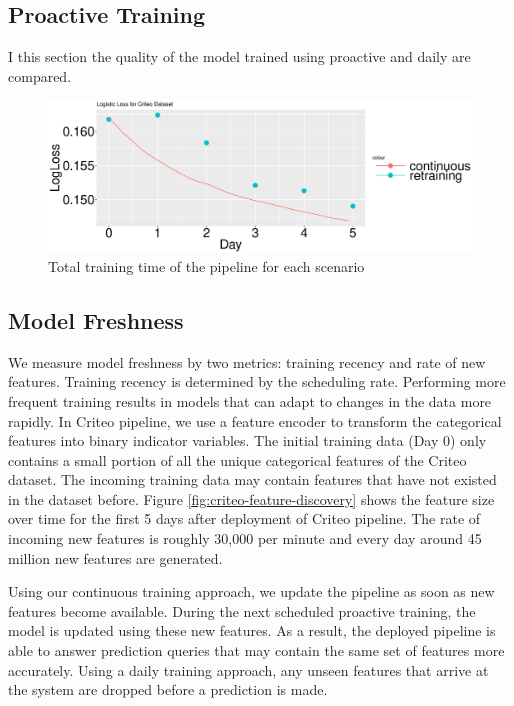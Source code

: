 \subsection{Proactive Training}
I this section the quality of the model trained using proactive and daily are compared.
\begin{figure}[h!]
\centering
\includegraphics[width=\columnwidth]{../images/experiment-results/criteo-log-loss-continuous-vs-daily.eps}
\caption{Total training time of the pipeline for each scenario}
\label{fig:loss-proactive-vs-daily}
\vspace{2mm}
\end{figure}


\subsection{Model Freshness}
We measure model freshness by two metrics: training recency and rate of new features.
Training recency is determined by the scheduling rate.
Performing more frequent training results in models that can adapt to changes in the data more rapidly.
In Criteo pipeline, we use a feature encoder to transform the categorical features into binary indicator variables.
The initial training data (Day 0) only contains a small portion of all the unique categorical features of the Criteo dataset.
The incoming training data may contain features that have not existed in the dataset before.
Figure \ref{fig:criteo-feature-discovery} shows the feature size over time for the first 5 days after deployment of Criteo pipeline.
The rate of incoming new features is roughly 30,000 per minute and every day around 45 million new features are generated.

Using our continuous training approach, we update the pipeline as soon as new features become available.
During the next scheduled proactive training, the model is updated using these new features.
As a result, the deployed pipeline is able to answer prediction queries that may contain the same set of features more accurately.
Using a daily training approach, any unseen features that arrive at the system are dropped before a prediction is made.


